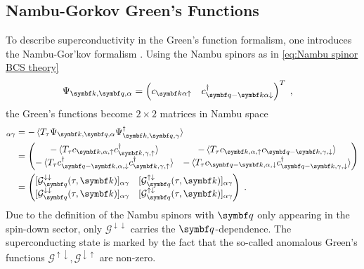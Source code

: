 \documentclass[../notes.tex]{subfiles}
\begin{document}
\subsection*{Nambu-Gorkov Green's Functions}

To describe superconductivity in the Green's function formalism, one introduces the Nambu-Gor'kov formalism \cite{georgesDynamicalMeanfieldTheory1996}.
Using the Nambu spinors as in \cref{eq:Nambu spinor BCS theory}
\begin{align}
	\Psi_{\vb{k}, \vb{q}, \alpha} &= 
	\begin{pmatrix}
		c_{\vb{k} \alpha \uparrow} & 
		c_{\vb{q} -\vb{k} \alpha \downarrow}^{\dagger}
	\end{pmatrix}^{T} \;,
\end{align}
the Green's functions become \(2 \times 2\) matrices in Nambu space
\begin{align}
	[\mathcal{G}_{\vb{q}} (\tau, \vb{k})]_{\alpha \gamma} &= -\braket{T_{\tau} \Psi_{\vb{k}, \vb{q}, \alpha} \Psi_{\vb{k}, \vb{q}, \gamma}^{\dagger}} \\ 
	&= \begin{pmatrix}
		-\braket{T_{\tau} c_{\vb{k}, \alpha, \uparrow} c_{\vb{k}, \gamma, \uparrow}^{\dagger}} &
		-\braket{T_{\tau} c_{\vb{k}, \alpha, \uparrow} c_{\vb{q} - \vb{k}, \gamma, \downarrow}} \\
		-\braket{T_{\tau} c_{\vb{q} - \vb{k}, \alpha, \downarrow}^{\dagger} c_{\vb{k}, \gamma, \uparrow}^{\dagger}} &
		-\braket{T_{\tau} c_{\vb{q} - \vb{k}, \alpha, \downarrow} c_{\vb{q} - \vb{k}, \gamma, \downarrow}^{\dagger}}
	\end{pmatrix} \\
	&= \begin{pmatrix}
		[\mathcal{G}^{\downarrow \downarrow}_{\vb{q}} (\tau, \vb{k})]_{\alpha \gamma} & [\mathcal{G}^{\uparrow \downarrow}_{\vb{q}} (\tau, \vb{k})]_{\alpha \gamma} \\
		[\mathcal{G}^{\downarrow \downarrow}_{\vb{q}} (\tau, \vb{k})]_{\alpha \gamma} & [\mathcal{G}^{\uparrow \downarrow}_{\vb{q}} (\tau, \vb{k})]_{\alpha \gamma} \\
	\end{pmatrix} \;.
\end{align}
Due to the definition of the Nambu spinors with \(\vb{q}\) only appearing in the spin-down sector, only \(\mathcal{G}^{\downarrow \downarrow}\) carries the \(\vb{q}\)-dependence.
The superconducting state is marked by the fact that the so-called anomalous Green's functions \(\mathcal{G}^{\uparrow \downarrow}, \mathcal{G}^{\downarrow \uparrow}\) are non-zero.
\end{document}
